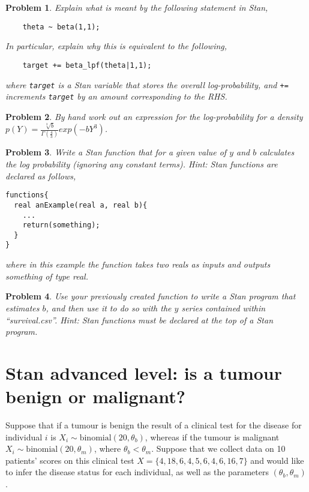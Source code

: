 \documentclass{article}
\newtheorem{problem}{Problem}[section]
\begin{document}
\begin{problem}
	Explain what is meant by the following statement in Stan,
	
	\begin{verbatim}
	theta ~ beta(1,1);
	\end{verbatim}
	
	In particular, explain why this is equivalent to the following,
	
	\begin{verbatim}
	target += beta_lpf(theta|1,1);
	\end{verbatim}
	
	where \texttt{target} is a Stan variable that stores the overall log-probability, and \texttt{+=} increments \texttt{target} by an amount corresponding to the RHS.
	
\end{problem}


\begin{problem}
By hand work out an expression for the log-probability for a density $p(Y) =\frac{\sqrt[3]{b}}{\Gamma\left(\frac{4}{3}\right)} exp(-b Y^3)$.
\end{problem}

\begin{problem}
Write a Stan function that for a given value of $y$ and $b$ calculates the log probability (ignoring any constant terms). Hint: Stan functions are declared as follows,
	
\begin{verbatim}
functions{
  real anExample(real a, real b){
    ...
    return(something);
  }
}
\end{verbatim}
	
where in this example the function takes two reals as inputs and outputs something of type real.
\end{problem}

\begin{problem}
Use your previously created function to write a Stan program that estimates $b$, and then use it to do so with the $y$ series contained within ``survival.csv''. Hint: Stan functions must be declared at the top of a Stan program.
\end{problem}

\section{Stan advanced level: is a tumour benign or malignant?}
Suppose that if a tumour is benign the result of a clinical test for the disease for individual $i$ is $X_i\sim \text{binomial}(20,\theta_b)$, whereas if the tumour is malignant $X_i\sim \text{binomial}(20,\theta_m)$, where $\theta_b < \theta_m$. Suppose that we collect data on 10 patients' scores on this clinical test $X=\{4,18,6,4,5,6,4,6,16,7\}$ and would like to infer the disease status for each individual, as well as the parameters $(\theta_b,\theta_m)$.
\end{document}
